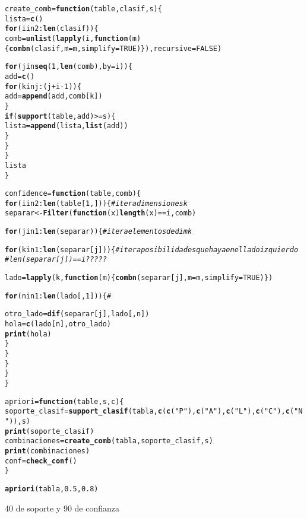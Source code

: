 \documentclass[12pt]{report}\usepackage[]{graphicx}\usepackage[dvipsnames]{xcolor}
\makeatletter
\newcommand{\hlstr}[1]{\textcolor[rgb]{0.192,0.494,0.8}{#1}}%
\newcommand{\hlcom}[1]{\textcolor[rgb]{0.678,0.584,0.686}{\textit{#1}}}%
\newcommand{\hlkwd}[1]{\textcolor[rgb]{0.737,0.353,0.396}{\textbf{#1}}}%
\newenvironment{kframe}{%
 \def\at@end@of@kframe{}%
 \ifinner\ifhmode%
  \def\at@end@of@kframe{\end{minipage}}%
  \begin{minipage}{\columnwidth}%
 \fi\fi%
 \def\FrameCommand##1{\hskip\@totalleftmargin \hskip-\fboxsep
 \colorbox{shadecolor}{##1}\hskip-\fboxsep
     \hskip-\linewidth \hskip-\@totalleftmargin \hskip\columnwidth}%
 \MakeFramed {\advance\hsize-\width
   \@totalleftmargin\z@ \linewidth\hsize
   \@setminipage}}%
 {\par\unskip\endMakeFramed%
 \at@end@of@kframe}
\newenvironment{knitrout}{}{} %
\makeatother
\begin{document}
\begin{knitrout}
\begin{kframe}
\begin{alltt}
create_comb = \hlkwd{function}(table, clasif, s) \{
	lista = \hlkwd{c}()
	\hlkwd{for} (i in 2:\hlkwd{len}(clasif)) \{
		comb = \hlkwd{unlist}(\hlkwd{lapply}(i, \hlkwd{function}(m) \{\hlkwd{combn}(clasif, m=m, simplify=TRUE)\}), recursive=FALSE)
		
		\hlkwd{for} (j in \hlkwd{seq}(1, \hlkwd{len}(comb), by=i)) \{
			add = \hlkwd{c}()
			\hlkwd{for} (k in j:(j+i-1)) \{
				add = \hlkwd{append}(add, comb[k])
			\}
			\hlkwd{if} (\hlkwd{support}(table, add) >= s) \{
				lista = \hlkwd{append}(lista, \hlkwd{list}(add))
			\}
		\}
	\}
	lista
\}

confidence = \hlkwd{function}(table, comb) \{
	\hlkwd{for} (i in 2:\hlkwd{len}(table[1,])) \{ \hlcom{#itera dimensiones k}
		separar <- \hlkwd{Filter}(\hlkwd{function}(x) \hlkwd{length}(x)==i, comb)
		
		\hlkwd{for} (j in 1:\hlkwd{len}(separar)) \{ \hlcom{#itera elementos de dim k}
		
			\hlkwd{for} (k in 1:\hlkwd{len}(separar[j])) \{ \hlcom{#itera posibilidades que haya en el lado izquierdo}
\hlcom{				#len(separar[j]) == i ?????}
			
				lado = \hlkwd{lapply}(k, \hlkwd{function}(m) \{\hlkwd{combn}(separar[j], m=m, simplify=TRUE)\})
				
				
				\hlkwd{for} (n in 1:\hlkwd{len}(lado[,1])) \{ \hlcom{#}
				
					otro_lado = \hlkwd{dif}(separar[j], lado[,n])
					hola = \hlkwd{c}(lado[n], otro_lado)
					\hlkwd{print}(hola)
				\}
			\}
		\}
	\}
\}

apriori = \hlkwd{function}(table, s, c) \{
	soporte_clasif = \hlkwd{support_clasif}(tabla, \hlkwd{c}(\hlkwd{c}(\hlstr{"P"}), \hlkwd{c}(\hlstr{"A"}) ,\hlkwd{c}(\hlstr{"L"}), \hlkwd{c}(\hlstr{"C"}), \hlkwd{c}(\hlstr{"N"})), s)
	\hlkwd{print}(soporte_clasif)
	combinaciones = \hlkwd{create_comb}(tabla, soporte_clasif, s)
	\hlkwd{print}(combinaciones)
	conf = \hlkwd{check_conf}()
\}


\hlkwd{apriori}(tabla, 0.5, 0.8)



\end{alltt}


{\ttfamily\noindent\bfseries{}}\end{kframe}
\end{knitrout}


40 de soporte y 90 de confianza
\end{document}
